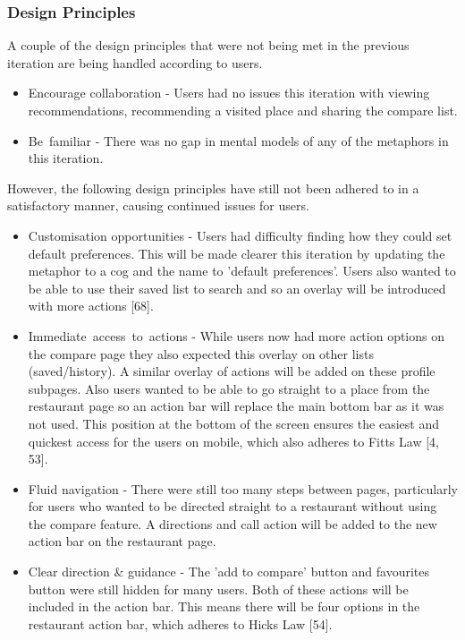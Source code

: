 \documentclass[a4 paper, 12pt]{article}
\begin{document}
    \subsubsection{Design Principles}

    A couple of the design principles that were not being met in the previous iteration are being handled according to users. 
    \begin{itemize}
        \item Encourage collaboration - Users had no issues this iteration with viewing recommendations, recommending a visited place and sharing the compare list.
        \item Be familiar - There was no gap in mental models of any of the metaphors in this iteration.    
    \end{itemize}
       
    However, the following design principles have still not been adhered to in a satisfactory manner, causing continued issues for users.
    \begin{itemize}
        \item Customisation opportunities - Users had difficulty finding how they could set default preferences. This will be made clearer this iteration by updating the metaphor to a cog and the name to 'default preferences'. Users also wanted to be able to use their saved list to search and so an overlay will be introduced with more actions [68].
        \item Immediate access to actions - While users now had more action options on the compare page they also expected this overlay on other lists (saved/history). A similar overlay of actions will be added on these profile subpages. Also users wanted to be able to go straight to a place from the restaurant page so an action bar will replace the main bottom bar as it was not used. This position at the bottom of the screen ensures the easiest and quickest access for the users on mobile, which also adheres to Fitts Law [4, 53].
        \item Fluid navigation - There were still too many steps between pages, particularly for users who wanted to be directed straight to a restaurant without using the compare feature. A directions and call action will be added to the new action bar on the restaurant page.
        \item Clear direction \& guidance - The 'add to compare' button and favourites button were still hidden for many users. Both of these actions will be included in the action bar. This means there will be four options in the restaurant action bar, which adheres to Hicks Law [54].
    \end{itemize}
    
\end{document}
